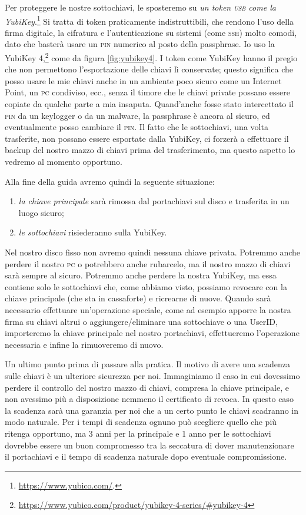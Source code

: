 Per proteggere le nostre sottochiavi, le sposteremo su \emph{un token
\textsc{usb} come la YubiKey}.\footnote{\url{https://www.yubico.com/}.} Si
tratta di token praticamente indistruttibili, che rendono l'uso della firma
digitale, la cifratura e l'autenticazione su sistemi (come \textsc{ssh}) molto
comodi, dato che basterà usare un \textsc{pin} numerico al posto della
passphrase. Io uso la YubiKey
4,\footnote{\url{https://www.yubico.com/product/yubikey-4-series/\#yubikey-4}}
come da figura \ref{fig:yubikey4}. I token come YubiKey hanno il pregio che non
permettono l'esportazione delle chiavi lì conservate; questo significa che posso
usare le mie chiavi anche in un ambiente poco sicuro come un Internet Point, un
\textsc{pc} condiviso, ecc., senza il timore che le chiavi private possano
essere copiate da qualche parte a mia insaputa. Quand'anche fosse stato
intercettato il \textsc{pin} da un keylogger o da un malware, la passphrase è
ancora al sicuro, ed eventualmente posso cambiare il \textsc{pin}. Il fatto che
le sottochiavi, una volta trasferite, non possano essere esportate dalla
YubiKey, ci forzerà a effettuare il backup del nostro mazzo di chiavi prima del
trasferimento, ma questo aspetto lo vedremo al momento opportuno.

Alla fine della guida avremo quindi la seguente situazione:

\begin{enumerate}
  \item \emph{la chiave principale} sarà rimossa dal portachiavi sul disco e trasferita
  in un luogo sicuro;
  \item \emph{le sottochiavi} risiederanno sulla YubiKey.
\end{enumerate}

Nel nostro disco fisso non avremo quindi nessuna chiave privata. Potremmo anche
perdere il nostro \textsc{pc} o potrebbero anche rubarcelo, ma il nostro mazzo
di chiavi sarà sempre al sicuro. Potremmo anche perdere la nostra YubiKey, ma
essa contiene solo le sottochiavi che, come abbiamo visto, possiamo revocare con
la chiave principale (che sta in cassaforte) e ricrearne di nuove. Quando sarà
necessario effettuare un'operazione speciale, come ad esempio apporre la nostra
firma su chiavi altrui o aggiungere/eliminare una sottochiave o una UserID,
importeremo la chiave principale nel nostro portachiavi, effettueremo
l'operazione necessaria e infine la rimuoveremo di nuovo.\bigskip

\noindent Un ultimo punto prima di passare alla pratica. Il motivo di avere una
scadenza sulle chiavi è un ulteriore sicurezza per noi. Immaginiamo il caso in
cui dovessimo perdere il controllo del nostro mazzo di chiavi, compresa la
chiave principale, e non avessimo più a disposizione nemmeno il certificato di
revoca. In questo caso la scadenza sarà una garanzia per noi che a un certo
punto le chiavi scadranno in modo naturale. Per i tempi di scadenza ognuno può
scegliere quello che più ritenga opportuno, ma 3 anni per la principale e 1 anno
per le sottochiavi dovrebbe essere un buon compromesso tra la seccatura di dover
manutenzionare il portachiavi e il tempo di scadenza naturale dopo eventuale
compromissione.\bigskip


